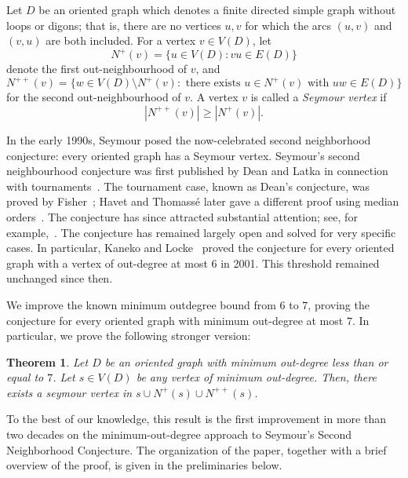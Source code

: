 \documentclass[a4paper,fleqn]{cas-sc}
\newtheorem{theorem}{Theorem}[section]
\theoremstyle{definition}
\begin{document}
Let \(D\) be an oriented graph which denotes a finite directed simple graph without loops or digons; that is, there are no vertices $u,v$ for which the arcs $(u,v)$ and $(v,u)$ are both included. For a vertex \(v\in V(D)\), let \[ N^+(v)=\{u\in V(D): vu\in E(D)\} \] denote the first out-neighbourhood of \(v\), and \[ N^{++}(v)=\{w\in V(D)\setminus N^+(v): \text{ there exists }u\in N^+(v)\text{ with }uw\in E(D)\} \] for the second out-neighbourhood of \(v\). A vertex \(v\) is called a \emph{Seymour vertex} if \[ |N^{++}(v)|\ge |N^+(v)|. \]

In the early 1990s, Seymour posed the now-celebrated second neighborhood conjecture: every oriented graph has a Seymour vertex. Seymour's second neighbourhood conjecture was first published by Dean and Latka in connection with tournaments~\cite{DeanLatka1995}. The tournament case, known as Dean's conjecture, was proved by Fisher~\cite{Fisher1996}; Havet and Thomassé later gave a different proof using median orders~\cite{HavetThomasse2000}. The conjecture has since attracted substantial attention; see, for example,~\cite{AiGerkeGutinWangYeoZhou2024,BrantnerBrockmanKaySnively2009, CohnGodboleHarknessZhang2016,DaraFrancisJacobNarayanan2022, EspunyDiazGiraoGranetKronenberg2024,FidlerYuster2007,Ghazal2012, HernandezCruzGaleanaSanchez2012,KanekoLocke2001,LiangXu2017, Lim2020,Llado2013,MezherDaamouch2024,Seacrest2018, guo2026seymourtightorientations, huang2024improvedboundseymourssecond}. The conjecture has remained largely open and solved for very specific cases. In particular, Kaneko and Locke~\cite{KanekoLocke2001} proved the conjecture for every oriented graph with a vertex of out-degree at most \(6\) in 2001. This threshold remained unchanged since then.

We improve the known minimum outdegree bound from \(6\) to \(7\), proving the conjecture for every oriented graph with minimum out-degree at most \(7\). In particular, we prove the following stronger version:
\begin{theorem}
    Let $D$ be an oriented graph with minimum out-degree less than or equal to $7$. Let $s\in V(D)$ be any vertex of minimum out-degree. Then, there exists a seymour vertex in $s\cup N^+(s) \cup N^{++}(s)$.
\end{theorem}
To the best of our knowledge, this result is the first improvement in more than two decades on the minimum-out-degree approach to Seymour's Second Neighborhood Conjecture. The organization of the paper, together with a brief overview of the proof, is given in the preliminaries below.
\end{document}
